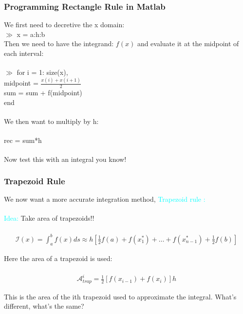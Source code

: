 \documentclass{beamer}
\newcommand{\tab}{\hspace{10mm}}
\begin{document}
\begin{frame}
\frametitle{Programming Rectangle Rule in Matlab} 

We first need to decretive the x domain: \\

$\gg$ x = a:h:b\\

Then we need to have the integrand: $f(x)$ and evaluate it at the midpoint of each interval: \\
\ \\
$\gg $ for i = 1: size(x), \\
\tab midpoint = $\frac{x(i)+x(i+1)}{2}$\\
\tab sum = sum + f(midpoint)\\
end \\
\ \\

We then want to multiply by h: \\
\ \\

rec = sum*h \\
 \ \\
 Now test this with an integral you know! 
 
\end{frame}
%
\begin{frame}
\frametitle{Trapezoid Rule}

We now want a more accurate integration method, \textcolor{cyan}{Trapezoid rule :}\\
\ \\
\textcolor{cyan}{Idea:} Take area of trapezoids!! \\ 
\ \\

\begin{align*}
\mathcal{I}(x)= \int^{b}_{a}f(x)ds\approx h[\frac{1}{2}f(a) + f(x_1^{\ast}) + \hdots + f(x_{n-1}^{\ast}) + \frac{1}{2}f(b)]
\end{align*}

Here the area of a trapezoid is used:\\
\ \\
\begin{align*}
\mathcal{A}^{i}_{trap} = \frac{1}{2}[f(x_{i-1}) + f(x_{i})]h
\end{align*} 

This is the area of the ith trapezoid used to approximate the integral. What's different, what's the same? 
\end{frame}
\end{document}
